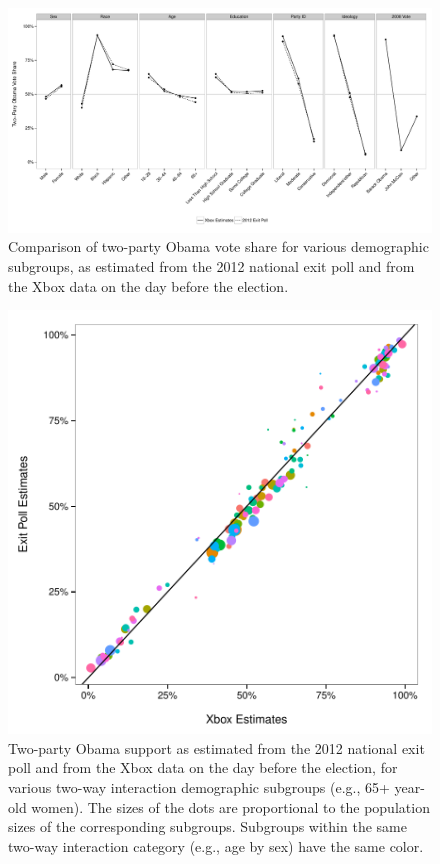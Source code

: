 \documentclass[preprint,authoryear,12pt]{elsarticle}
\begin{document}
\begin{figure}
  \centering
  \includegraphics[width=\textwidth]{"demo_group_marginals"}
  \caption{Comparison of two-party Obama vote share for various demographic subgroups,
  	as estimated from the 2012 national exit poll and from the Xbox data on the day before the election.
    }
  \label{fig:marginal_comp}
\end{figure}

\begin{figure}
  \centering
  \includegraphics[width=.6\textwidth]{"demo_groups_two_way_interaction"}
  \caption{Two-party Obama support as estimated from
  the 2012 national exit poll and from the Xbox data on the day before the election,
    for various two-way interaction demographic subgroups (e.g., 65+ year-old women).
    The sizes of the dots are proportional to the
    population sizes of the corresponding subgroups. Subgroups within the same
    two-way interaction category (e.g., age by sex) have the same color.}
  \label{fig:two_way_comp}
\end{figure}
\end{document}
